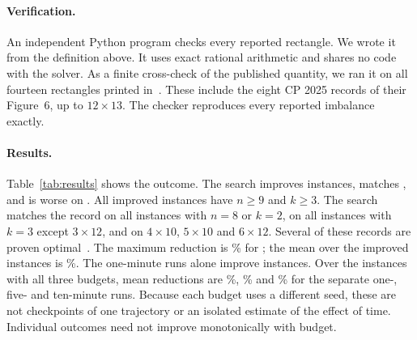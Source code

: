 \documentclass[11pt]{article}
\begin{document}
\paragraph{Verification.} An independent Python program checks every reported rectangle. We wrote
it from the definition above. It uses exact rational arithmetic and shares no code with the
solver. As a finite cross-check of the published quantity, we ran it on all fourteen
rectangles printed in~\citep{RamaswamySzeider2023,VoborilRamaswamySzeider2025}. These include the
eight CP 2025 records of their Figure~6, up to $12\times13$. The checker reproduces every reported
imbalance exactly.

\paragraph{Results.} Table~\ref{tab:results} shows the outcome. The
search improves \NumImproved{} instances, matches \NumMatched{}, and is worse on \NumWorse. All
improved instances have $n\ge 9$ and $k\ge 3$. The search matches the record on all instances
with $n=8$ or $k=2$, on all instances with $k=3$ except $3\times12$, and on $4\times10$,
$5\times10$ and $6\times12$. Several of these records are proven
optimal~\citep{RamaswamySzeider2023}. The maximum reduction is \MaxGain\% for \TopCell;
the mean over the \NumImproved{} improved instances is \MeanGain\%.
The one-minute runs alone improve \NumImprovedOneMin{} instances. Over the
\NumBudgetCells{} instances with all three budgets, mean reductions are \BudgetOneMin\%,
\BudgetFiveMin\% and \BudgetTenMin\% for the separate one-, five- and ten-minute runs.
Because each budget uses a different seed, these are not checkpoints of one trajectory
or an isolated estimate of the effect of time. Individual outcomes need not improve
monotonically with budget.

\begin{table}[tb]
\centering
\small

\caption{Reference and achieved imbalance of $k\times n$ Latin rectangles. Bold: new value from this work,
with the record~\citep{VoborilRamaswamySzeider2025} struck through below it. Plain: record that
our search matches.}
\label{tab:results}
\end{table}
\end{document}
